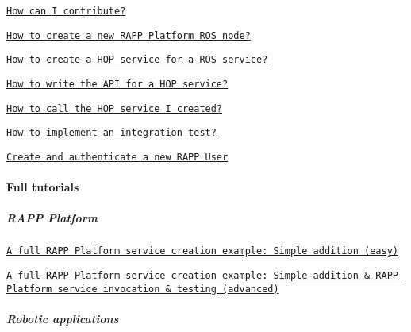 \begin{DoxyItemize}
\item \href{https://github.com/rapp-project/rapp-platform/wiki/How-can-I-contribute%3F}{\tt How can I contribute?}
\item \href{https://github.com/rapp-project/rapp-platform/wiki/How-to-create-a-new-RAPP-Platform-ROS-node%3F}{\tt How to create a new R\-A\-P\-P Platform R\-O\-S node?}
\item \href{https://github.com/rapp-project/rapp-platform/wiki/How-to-create-a-HOP-service-for-a-ROS-service%3F}{\tt How to create a H\-O\-P service for a R\-O\-S service?}
\item \href{https://github.com/rapp-project/rapp-platform/wiki/How-to-write-the-API-for-a-HOP-service%3F}{\tt How to write the A\-P\-I for a H\-O\-P service?}
\item \href{https://github.com/rapp-project/rapp-platform/wiki/How-to-call-the-HOP-service-I-created%3F}{\tt How to call the H\-O\-P service I created?}
\item \href{https://github.com/rapp-project/rapp-platform/wiki/How-to-implement-an-integration-test%3F}{\tt How to implement an integration test?}
\item \href{https://github.com/rapp-project/rapp-platform/wiki/Create-a-new-RAPP-user}{\tt Create and authenticate a new R\-A\-P\-P User}
\end{DoxyItemize}

\paragraph*{Full tutorials}

\subparagraph*{R\-A\-P\-P Platform}


\begin{DoxyItemize}
\item \href{https://github.com/rapp-project/rapp-platform/wiki/A-full-RAPP-Platform-service-creation-example}{\tt A full R\-A\-P\-P Platform service creation example\-: Simple addition (easy)}
\item \href{https://github.com/rapp-project/rapp-platform/wiki/A-full-RAPP-Platform-service-creation-example-advanced}{\tt A full R\-A\-P\-P Platform service creation example\-: Simple addition \& R\-A\-P\-P Platform service invocation \& testing (advanced)}
\end{DoxyItemize}

\subparagraph*{Robotic applications}


